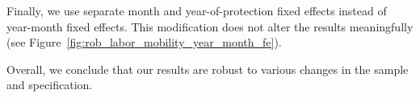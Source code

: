 Finally, we use separate month and year-of-protection fixed effects instead of year-month fixed effects. This modification does not alter the results meaningfully (see Figure~\ref{fig:rob_labor_mobility_year_month_fe}).

Overall, we conclude that our results are robust to various changes in the sample and specification.








